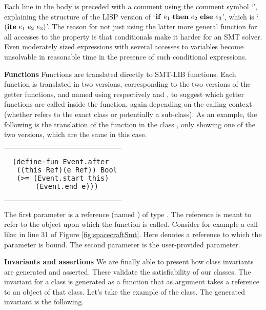 \noindent Each line in the body is preceded with a comment using the
comment symbol `\code{;}', explaining the structure of the LISP
version of `${\bf if}\ e_1\ {\bf then}\ e_2\ {\bf else}\ e_3$', which
is `$({\bf ite}\ e_1\ e_2\ e_3)$'. The reason for not just using the
latter more general function  for all accesses
to the  property is that conditionals make it harder for
an SMT solver. Even moderately sized expressions with several accesses
to variables become unsolvable in reasonable time in the presence of
such conditional expressions.

\textbf{Functions} Functions are translated directly to SMT-LIB
functions.  Each function is translated in two versions, corresponding
to the two versions of the getter functions, and named using
respectively  and
, to suggest which getter functions are
called inside the function, again depending on the calling context
(whether  refers to the exact class or potentially a
sub-class). As an example, the following is the translation of the
 function in the class , only showing one of
the two versions, which are the same in this case.

\begin{center}
\begin{tabular}{c}
\small
\begin{lstlisting}
(define-fun Event.after 
  ((this Ref)(e Ref)) Bool
  (>= (Event.start this)  
  (Event.end e)))
\end{lstlisting}
\end{tabular}
\end{center}

\noindent The first parameter is a reference (named ) of
type . The  reference is meant to refer to the
object upon which the function is called. Consider for example a call
like:  in line 31 of Figure
\ref{fig:spacecraftSmt}. Here  denotes a reference
to which the parameter  is bound.  The second parameter is
the user-provided parameter.


\textbf{Invariants and assertions} We are finally able to present how
class invariants are generated and asserted. These validate the
satisfiability of our classes.  The invariant for a class is generated
as a function that as argument takes a  reference to an
object of that class. Let's take the example of the
 class. The generated invariant is the following.

